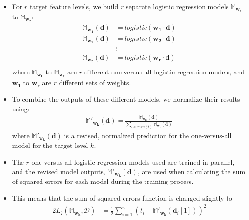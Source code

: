 \documentclass[xcolor={table}]{beamer}
\begin{document}
\begin{frame} 
\begin{itemize}
\item For $r$  target feature levels, we build $r$ separate logistic regression models $\mathbb{M}_{\mathbf{w_1}}$ to $\mathbb{M}_{\mathbf{w_r}}$:
\begin{equation}
	\begin{alignedat}{2}
	\mathbb{M}_{\mathbf{w_1}}(\mathbf{d}) & = logistic(\mathbf{w_1} \cdot \mathbf{d}) \\
	\mathbb{M}_{\mathbf{\mathbf{w_2}}}(\mathbf{d}) & = logistic(\mathbf{\mathbf{w_2}} \cdot \mathbf{d}) \\
	&  \vdots \\
	\mathbb{M}_{\mathbf{w_r}}(\mathbf{d}) & = logistic(\mathbf{w_r} \cdot \mathbf{d}) \\
	\end{alignedat}
\label{eqn:multinomialLogisticRegression}
\end{equation}
\noindent where $\mathbb{M}_{\mathbf{w_1}}$ to $\mathbb{M}_{\mathbf{w_r}}$ are $r$ different one-versus-all logistic regression models, and $\mathbf{w_1}$ to $\mathbf{w_r}$ are $r$ different sets of weights.
\end{itemize}
\end{frame} 


\begin{frame} 
\begin{itemize}
\item To combine the outputs of these different models, we normalize their results using: 
\begin{equation}
	\begin{alignedat}{2}
		\mathbb{M}'_{\mathbf{w_k}}(\mathbf{d}) = \frac{\mathbb{M}_{\mathbf{w_k}}(\mathbf{d})}{\displaystyle\sum_{l \in levels(t)}\mathbb{M}_{\mathbf{w}_l}(\mathbf{d})} 
	\end{alignedat}
\label{eqn:softmax}
\end{equation}
\noindent where $\mathbb{M}'_{\mathbf{w_k}}(\mathbf{d})$ is a revised, normalized prediction for the one-versus-all model for the target level $k$. 
\end{itemize}
\end{frame} 



\begin{frame} 
\begin{itemize}
\item The $r$ one-versus-all logistic regression models used are trained in \alert{parallel}, and the \alert{revised model outputs}, $\mathbb{M}'_{\mathbf{w_k}}(\mathbf{d})$, are used when calculating the sum of squared errors for each model during the training process.  
\item This means that the sum of squared errors function is changed slightly to
\begin{alignat}{2}
L_2(\mathbb{M}_{\mathbf{w_k}}, \mathcal{D}) & = \frac{1}{2} \sum_{i=1}^{n} \left(t_i - \mathbb{M}'_{\mathbf{w_k}}(\mathbf{d}_i\left[1\right])\right)^2 
\end{alignat}
\end{itemize}
\end{frame} 
\end{document}
